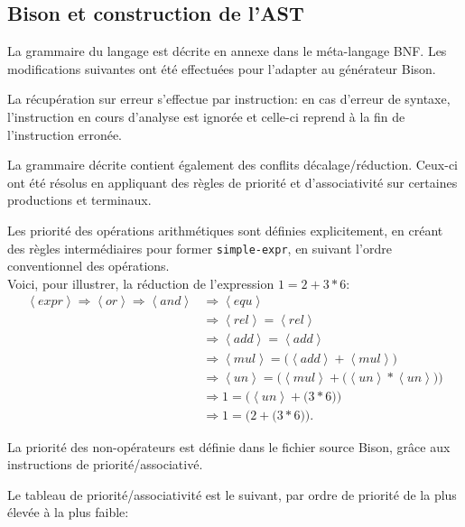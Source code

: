 \documentclass[paper=a4, fontsize=11pt]{scrartcl}
\numberwithin{equation}{section}		%
\numberwithin{figure}{section}			%
\numberwithin{table}{section}				%
\begin{document}
\subsection{Bison et construction de l'AST}

La grammaire du langage est décrite en annexe dans le méta-langage BNF. Les modifications suivantes ont été effectuées pour l'adapter au générateur Bison.

La récupération sur erreur s'effectue par instruction: en cas d'erreur de syntaxe, l'instruction en cours d'analyse est ignorée et celle-ci reprend à la fin de l'instruction erronée.

La grammaire décrite contient également des conflits décalage/réduction.
Ceux-ci ont été résolus en appliquant des règles de priorité et d'associativité sur certaines productions et terminaux.

Les priorité des opérations arithmétiques sont définies explicitement, en créant des règles intermédiaires pour former \texttt{simple-expr}, en suivant l'ordre conventionnel des opérations. \\

Voici, pour illustrer, la réduction de l'expression $1 = 2 + 3 * 6$:
\begin{align*}
    \left< expr \right> \Longrightarrow \left< or \right> \Longrightarrow \left< and \right>
        &\Longrightarrow \left< equ \right> \\
        &\Longrightarrow \left< rel \right> = \left< rel \right> \\
        &\Longrightarrow \left< add \right> = \left< add \right> \\
        &\Longrightarrow \left< mul \right> = \big( \left< add \right> + \left< mul \right> \big) \\
        &\Longrightarrow \left< un \right> = \Big( \left< mul \right> + \big( \left< un \right> * \left< un \right> \big) \Big) \\
        &\Longrightarrow 1 = \Big( \left< un \right> + \big( 3 * 6 \big) \Big) \\
        &\Longrightarrow 1 = \Big( 2 + \big( 3 * 6 \big) \Big) .
\end{align*}

La priorité des non-opérateurs est définie dans le fichier source Bison, grâce aux instructions de priorité/associativé.

Le tableau de priorité/associativité est le suivant, par ordre de priorité de la plus élevée à la plus faible:
\end{document}
